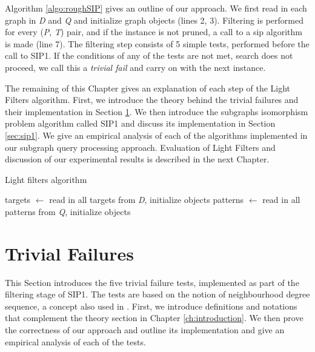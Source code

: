 \documentclass{l4proj}
\begin{document}
Algorithm \ref{algo:roughSIP} gives an outline of our approach. We first read in each graph in \emph{D} and \emph{Q} and initialize graph objects (lines 2, 3). Filtering is performed for every (\emph{P}, \emph{T}) pair,  and if the instance is not pruned, a call to a \gls{sip} algorithm is made (line 7). The filtering step consists of 5 simple tests, performed before the call to SIP1. If the conditions of any of the tests are not met, search does not proceed, we call this a \emph{trivial fail} and carry on with the next instance. 

The remaining of this Chapter gives an explanation of each step of the Light Filters algorithm. First, we introduce the theory behind the trivial failures and their implementation in Section \ref{sec:trivialFails}. We then introduce the subgraphs isomorphism problem algorithm called SIP1 and discuss its implementation in Section \ref{sec:sip1}. We give an empirical analysis of each of the algorithms implemented in our subgraph query processing approach. Evaluation of Light Filters and discussion of our experimental results is described in the next Chapter.

\begin{algorithm}
\centering
\caption{Light filters algorithm}
\label{algo:roughSIP}
\begin{algorithmic}[1]
\State targets $\gets$ read in all targets from \emph{D}, initialize objects
\State patterns $\gets$ read in all patterns from \emph{Q}, initialize objects
		 
    	\EndIf
    \EndFor
\EndFor
\EndProcedure
\end{algorithmic}
\end{algorithm}

\section{Trivial Failures}
\label{sec:trivialFails}

This Section introduces the five trivial failure tests, implemented as part of the filtering stage of SIP1. The tests are based on the notion of neighbourhood degree sequence, a concept also used in \cite{Solnon:2010}. First, we introduce definitions and notations that complement the theory section in Chapter \ref{ch:introduction}. We then prove the correctness of our approach and outline its implementation and give an empirical analysis of each of the tests.
\end{document}
